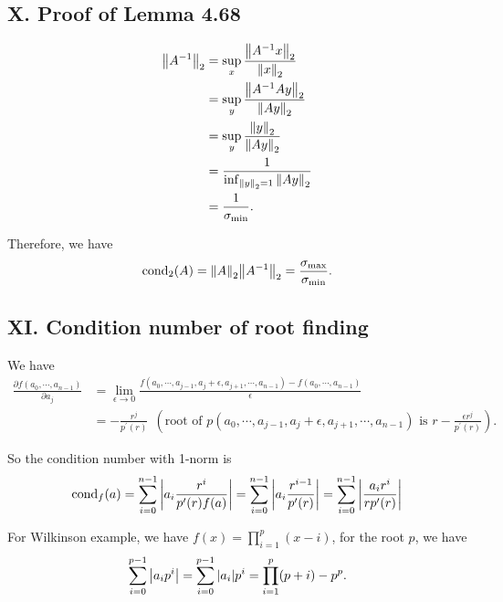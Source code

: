 \documentclass[a4paper]{article}
\begin{document}
\subsection*{X. Proof of Lemma 4.68}

\begin{equation}
    \begin{aligned}
        \norm{A^{-1}}_2 &= \sup_{x} \frac{\norm{A^{-1}x}_2}{\norm{x}_2} \\
        &= \sup_{y} \frac{\norm{A^{-1}A y}_2}{\norm{Ay}_2} \\
        &= \sup_{y} \frac{\norm{y}_2}{\norm{Ay}_2} \\
        &= \frac{1}{\inf_{\norm{y}_2=1} \norm{Ay}_2} \\
        &= \frac{1}{\sigma_{\min}}.
    \end{aligned}
\end{equation}

Therefore, we have
\begin{equation}
    \text{cond}_2(A) = \norm{A}_2 \norm{A^{-1}}_2 = \frac{\sigma_{\max}}{\sigma_{\min}}.
\end{equation}

\subsection*{XI. Condition number of root finding}

We have
\begin{equation}
    \begin{aligned}
        \frac{\partial f(a_0, \cdots, a_{n-1})}{\partial a_j} &= \lim_{\epsilon \to 0} \frac{f(a_0, \cdots, a_{j-1}, a_j+\epsilon, a_{j+1}, \cdots, a_{n-1}) - f(a_0, \cdots, a_{n-1})}{\epsilon} \\
        &= -\frac{r^j}{p^\prime(r)}~~(\text{root of }p(a_0, \cdots, a_{j-1}, a_j+\epsilon, a_{j+1}, \cdots, a_{n-1}) \text{ is } r-\frac{\epsilon r^j}{p^\prime(r)}).
    \end{aligned}
\end{equation}

So the condition number with 1-norm is 
\begin{equation}
    \mathrm{cond}_f(a) = \sum_{i=0}^{n-1} \abs{a_i \frac{r^i}{p^\prime(r) f(a)}} = \sum_{i=0}^{n-1} \abs{a_i \frac{r^{i-1}}{p^\prime(r)}} = \sum_{i=0}^{n-1} \abs{\frac{a_i r^{i}}{r p^\prime(r)}}
\end{equation}


For Wilkinson example, we have $f(x) = \prod_{i=1}^{p}(x-i)$, for the root $p$, we have 
\begin{equation}
    \sum_{i=0}^{p-1} \abs{a_i p^i} = \sum_{i=0}^{p-1} \abs{a_i} p^i = \prod_{i=1}^{p}(p+i) - p^p.
\end{equation}
\end{document}
